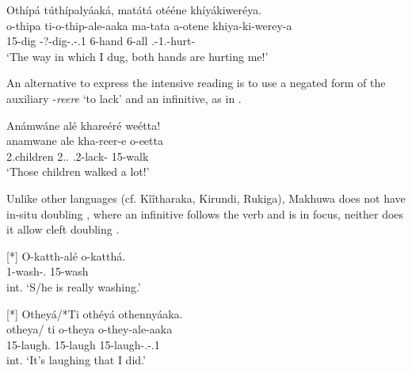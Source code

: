 \documentclass[output=paper]{langscibook}
\begin{document}
\ex
\label{bkm:Ref129163670}
Othípá túthípalyáaká, matátá otééne khíyákiweréya.\\
\gll
o-thipa  ti-o-thip-ale-aaka  ma-tata  a-otene  khiya-ki-werey-a\\
15-dig  \COP{}-?-dig-\PFV{}.\REL{}-\POSS{}.1\SG{}  6-hand  6-all  \NARR{}.\IPFV{}-1\SG{}.\OM{}-hurt-\FV{}\\
\glt
‘The way in which I dug, both hands are hurting me!’\\


\z

An alternative to express the intensive reading is to use a negated form of the auxiliary \nobreakdash-\textit{reere} ‘to lack’ and an infinitive, as in .

\ea
\label{bkm:Ref129161298}
Anámwáne alé khareéré weétta!\\
\gll
anamwane  ale  kha{}-reer-e  o-eetta\\
2.children  2.\DEM{}.\DIST{}  \NEG{}.2\SM{}-lack-\FV{}  15-walk\\
\glt
‘Those children walked a lot!’\\


\z

Unlike other languages (cf. Kîîtharaka, Kirundi, Rukiga), Makhuwa does not have in-situ doubling , where an infinitive follows the verb and is in focus, neither does it allow cleft doubling .

\ea
[*]{
\label{bkm:Ref109548598}
\gll
O-katth-alé  o-katthá.\\
1\SM{}-wash-\PFV{}.\CJ{}  15-wash\\
\glt
int. ‘S/he is really washing.’\\
}

\ex
[*]{
\label{bkm:Ref109899052}
Otheyá/*Ti othéyá othennyáaka.\\
\gll
otheya/  ti  o-theya  o-they-ale-aaka\\
15-laugh.\PRL{}  \COP{}  15-laugh  15-laugh-\PFV{}.\REL{}-\POSS{}.1\SG{}\\
\glt
int. ‘It’s laughing that I did.’\\
}


\z
\end{document}
